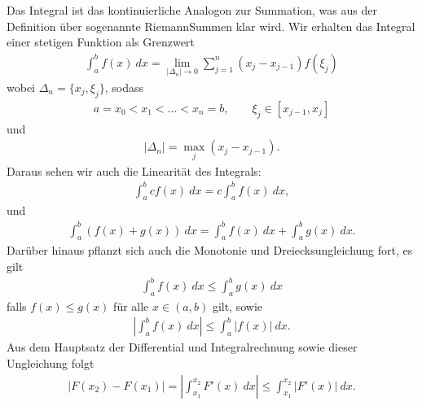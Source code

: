 \documentclass[letterpaper,10pt,english]{jupyterBook}
\begin{document}
Das Integral ist das kontinuierliche Analogon zur Summation, was aus der Definition über sogenannte Riemann\sphinxhyphen{}Summen klar wird. Wir erhalten das Integral einer stetigen Funktion als Grenzwert
\begin{equation*}
\begin{split} \int_a^b f(x)~dx = \lim_{|\Delta_n| \rightarrow 0} \sum_{j=1}^n (x_j - x_{j-1}) f(\xi_j) \end{split}
\end{equation*}
wobei \(\Delta_n = \{x_j,\xi_j\}\), sodass
\begin{equation*}
\begin{split} a = x_0 < x_1 < \ldots < x_n =b, \qquad \xi_j \in [x_{j-1},x_j]\end{split}
\end{equation*}
und
\begin{equation*}
\begin{split} \vert \Delta_n \vert = \max_j (x_j - x_{j-1}). \end{split}
\end{equation*}
Daraus sehen wir auch die Linearität des Integrals:
\begin{equation*}
\begin{split} \int_a^b  c f(x) ~dx = c \int_a^b   f(x) ~dx, \end{split}
\end{equation*}
und
\begin{equation*}
\begin{split} \int_a^b   ( f(x) + g(x)) ~dx = \int_a^b   f(x) ~dx + \int_a^b   g(x) ~dx. \end{split}
\end{equation*}
Darüber hinaus pflanzt sich auch die Monotonie und Dreiecksungleichung fort, es gilt
\begin{equation*}
\begin{split} \int_a^b   f(x) ~dx \leq  \int_a^b   g(x) ~dx  \end{split}
\end{equation*}
falls \(f(x) \leq g(x)\) für alle \(x \in (a,b)\) gilt, sowie
\begin{equation*}
\begin{split} \left\vert \int_a^b   f(x) ~dx \right\vert \leq  \int_a^b  \vert  f(x) \vert ~dx . \end{split}
\end{equation*}
Aus dem Hauptsatz der Differential\sphinxhyphen{} und Integralrechnung sowie dieser Ungleichung folgt
\begin{equation*}
\begin{split}\vert F(x_2) - F(x_1) \vert = \left\vert \int_{x_1}^{x_2}   F'(x) ~dx \right\vert
\leq  \int_{x_1}^{x_2}  \vert F'(x) \vert ~dx.\end{split}
\end{equation*}
\end{document}
